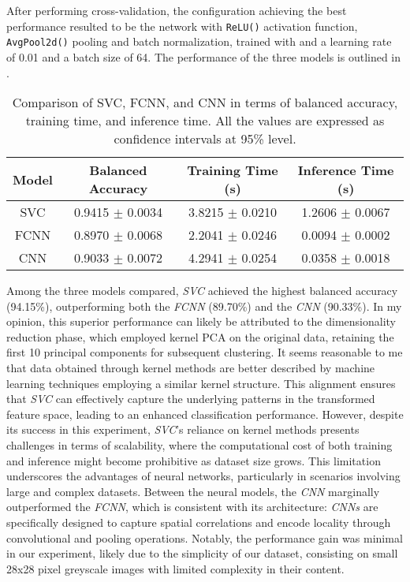 After performing cross-validation, the configuration achieving the best performance resulted to be the network with 
\texttt{ReLU()} activation function, \texttt{AvgPool2d()} pooling and batch normalization, trained with and a learning rate 
of 0.01 and a batch size of 64.
\newpage
The performance of the three models is outlined in .
\begin{table}[h!]
    \centering
    \begin{tabular}{|c|c|c|c|}
    \hline
    \textbf{Model} & \textbf{Balanced Accuracy} & \textbf{Training Time (s)} & \textbf{Inference Time (s)}  \\
    \hline
    SVC & 0.9415 $\pm$ 0.0034 & 3.8215 $\pm$ 0.0210 & 1.2606 $\pm$ 0.0067 \\
    FCNN & 0.8970 $\pm$ 0.0068 & 2.2041 $\pm$ 0.0246 & 0.0094 $\pm$ 0.0002 \\
    CNN & 0.9033 $\pm$ 0.0072 & 4.2941 $\pm$ 0.0254 & 0.0358 $\pm$ 0.0018 \\
    \hline
    \end{tabular}
    \caption{\footnotesize Comparison of SVC, FCNN, and CNN in terms of balanced accuracy, training time, and inference time. 
    All the values are expressed as confidence intervals at 95\% level.}
    \label{tab:model_comparison}
\end{table}

Among the three models compared, \emph{SVC} achieved the highest balanced accuracy (94.15\%), outperforming both the \emph{FCNN} (89.70\%) and the \emph{CNN} (90.33\%). 
In my opinion, this superior performance can likely be attributed to the dimensionality reduction phase, which employed kernel PCA on the original data, retaining the 
first 10 principal components for subsequent clustering. It seems reasonable to me that data obtained through kernel methods are better described by machine learning 
techniques employing a similar kernel structure. This alignment ensures that \emph{SVC} can effectively capture the underlying patterns in the transformed feature space, 
leading to an enhanced classification performance. However, despite its success in this experiment, \emph{SVC}'s reliance on kernel methods presents challenges in terms of
scalability, where the computational cost of both training and inference might become prohibitive as dataset size grows. This limitation underscores the advantages of
neural networks, particularly in scenarios involving large and complex datasets. Between the neural models, the \emph{CNN} marginally outperformed the \emph{FCNN}, 
which is consistent with its architecture: \emph{CNNs} are specifically designed to capture spatial correlations and encode locality through convolutional and pooling operations. 
Notably, the performance gain was minimal in our experiment, likely due to the simplicity of our dataset, consisting on small 28x28 pixel greyscale images with 
limited complexity in their content.